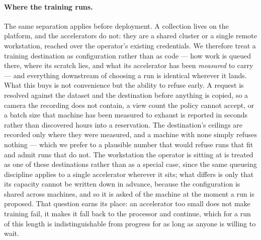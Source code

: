\paragraph{Where the training runs.} The same separation applies before
deployment. A collection lives on the platform, and the accelerators do not:
they are a shared cluster or a single remote workstation, reached over the
operator's existing credentials. We therefore treat a training destination as
configuration rather than as code --- how work is queued there, where its
scratch lies, and what its accelerator has been \emph{measured} to carry ---
and everything downstream of choosing a run is identical wherever it lands.
What this buys is not convenience but the ability to refuse early. A request
is resolved against the dataset and the destination before anything is
copied, so a camera the recording does not contain, a view count the policy
cannot accept, or a batch size that machine has been measured to exhaust is
reported in seconds rather than discovered hours into a reservation. The
destination's ceilings are recorded only where they were measured, and a
machine with none simply refuses nothing --- which we prefer to a plausible
number that would refuse runs that fit and admit runs that do not. The
workstation the operator is sitting at is treated as one of these destinations
rather than as a special case, since the same queueing discipline applies to a
single accelerator wherever it sits; what differs is only that its capacity
cannot be written down in advance, because the configuration is shared across
machines, and so it is asked of the machine at the moment a run is proposed.
That question earns its place: an accelerator too small does not make training
fail, it makes it fall back to the processor and continue, which for a run of
this length is indistinguishable from progress for as long as anyone is willing
to wait.

